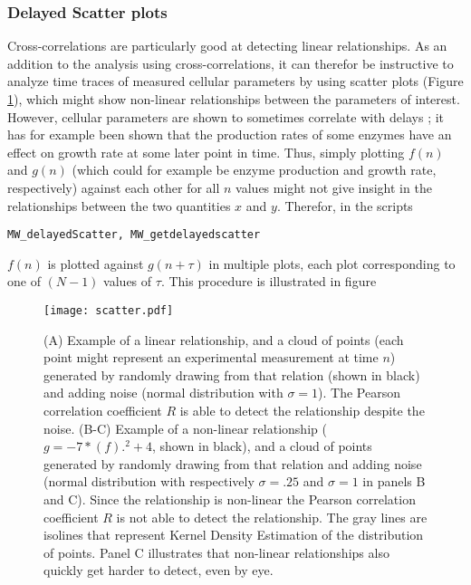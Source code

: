 {\subsubsection{Delayed Scatter plots}

Cross-correlations are particularly good at detecting linear relationships.
As an addition to the analysis using cross-correlations, 
it can therefor be instructive to analyze time traces of measured cellular parameters by using scatter plots (Figure \ref{fig:mm:scatter}), 
which might show non-linear relationships between the parameters of interest. 
%
However, cellular parameters are shown to sometimes correlate with delays \cite{Kiviet2014}; it has for example been shown that the production rates of some enzymes have an effect on growth rate at some later point in time.
Thus, simply plotting $f(n)$ and $g(n)$ (which could for example be enzyme production and growth rate, respectively) against each other for all $n$ values might not give insight in the relationships between the two quantities $x$ and $y$.
Therefor, in the scripts
\begin{verbatim}
MW_delayedScatter, MW_getdelayedscatter
\end{verbatim}
$f(n)$ is plotted against $g(n+\tau)$ in multiple plots, each plot corresponding to one of $(N-1)$ values of $\tau$.
This procedure is illustrated in figure 




\begin{figure}
	\centering
	\texttt{[image: scatter.pdf]}
	\caption{ 
		(A) Example of a linear relationship, and a cloud of points (each point might represent an experimental measurement at time $n$) generated by randomly drawing from that relation (shown in black) and adding noise (normal distribution with $\sigma=1$). The Pearson correlation coefficient $R$ is able to detect the relationship despite the noise.
		(B-C) Example of a non-linear relationship ($g=-7*(f).^2+4$, shown in black), and a cloud of points generated by randomly drawing from that relation and adding noise (normal distribution with respectively $\sigma=.25$ and $\sigma=1$ in panels B and C). Since the relationship is non-linear the Pearson correlation coefficient $R$ is not able to detect the relationship. The gray lines are isolines that represent Kernel Density Estimation of the distribution of points. Panel C illustrates that non-linear relationships also quickly get harder to detect, even by eye.
	}
	\label{fig:mm:scatter}
\end{figure}


}

